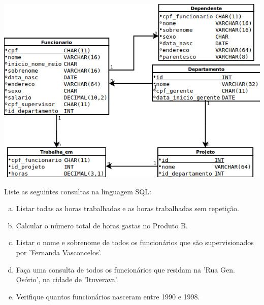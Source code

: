\begin{center}
  \includegraphics[scale=.5]{../empresa.png}
\end{center}

Liste as seguintes consultas na linguagem SQL:

\begin{enumerate}[a)]
\item Listar todas as horas trabalhadas e as horas trabalhadas sem repetição.
\item Calcular o número total de horas gastas no Produto B.
\item Listar o nome e sobrenome de todos os funcionários que são supervisionados por 'Fernanda Vasconcelos'.
\item Faça uma consulta de todos os funcionários que residam na 'Rua Gen. Osório', na cidade de 'Ituverava'.
\item Verifique quantos funcionários nasceram entre 1990 e 1998.
\end{enumerate}
